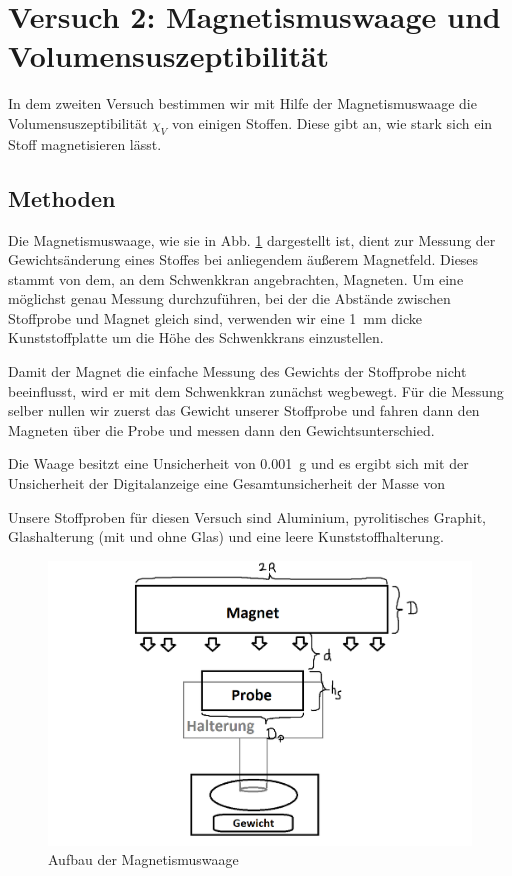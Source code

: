 \documentclass[11pt,a4paper,titlepage, ngerman]{article}
\begin{document}
	\section{Versuch 2: Magnetismuswaage  und Volumensuszeptibilität}		
		
		In dem zweiten Versuch bestimmen wir mit Hilfe der Magnetismuswaage die Volumensuszeptibilität $\chi _V$ von einigen Stoffen. Diese gibt an, wie stark sich ein Stoff magnetisieren lässt.		
		
		\subsection*{Methoden} 
		
			Die Magnetismuswaage, wie sie in Abb. \ref{fig:Magnetismuswaage} dargestellt ist, dient zur Messung der Gewichtsänderung eines Stoffes bei anliegendem äußerem Magnetfeld. Dieses stammt von dem, an dem Schwenkkran angebrachten, Magneten.
			Um eine möglichst genau Messung durchzuführen, bei der die Abstände zwischen Stoffprobe und Magnet gleich sind, verwenden wir eine \SI{1}{\mm} dicke Kunststoffplatte um die Höhe des Schwenkkrans einzustellen.
			
			Damit der Magnet die einfache Messung des Gewichts der Stoffprobe nicht beeinflusst, wird er mit dem Schwenkkran zunächst wegbewegt.
			Für die Messung selber nullen wir zuerst das Gewicht unserer Stoffprobe und fahren dann den Magneten über die Probe und messen dann den Gewichtsunterschied.
			
			Die Waage besitzt eine Unsicherheit von \SI{0,001}{\g} und es ergibt sich mit der Unsicherheit der Digitalanzeige eine Gesamtunsicherheit der Masse von %
			
			Unsere Stoffproben für diesen Versuch sind Aluminium, pyrolitisches Graphit, Glashalterung (mit und ohne Glas) und eine leere Kunststoffhalterung.
			
			\begin{figure}
				\includegraphics[width=\textwidth]{SkizzeMagnetwaage.png}
				\caption{Aufbau der Magnetismuswaage}
				\label{fig:Magnetismuswaage}
			\end{figure}
		
\end{document}
